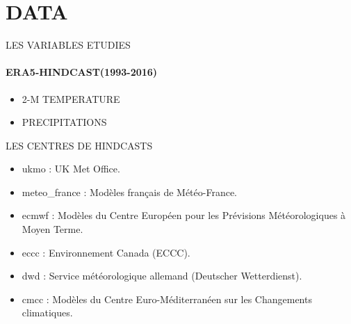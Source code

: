 \section{DATA}

\begin{frame}{LES VARIABLES ETUDIES}
\framesubtitle{ERA5-HINDCAST(1993-2016)}
    \begin{itemize}
         \item 2-M TEMPERATURE
        \item PRECIPITATIONS 
    \end{itemize}
\end{frame}

\begin{frame}{LES CENTRES DE HINDCASTS}
\begin{itemize}
    \item ukmo : UK Met Office.
    \item meteo\_france : Modèles français de Météo-France.
    \item ecmwf : Modèles du Centre Européen pour les Prévisions Météorologiques à Moyen Terme.
    \item eccc : Environnement Canada (ECCC).
    \item dwd : Service météorologique allemand (Deutscher Wetterdienst).
    \item cmcc : Modèles du Centre Euro-Méditerranéen sur les Changements climatiques.
\end{itemize}
  
\end{frame}
